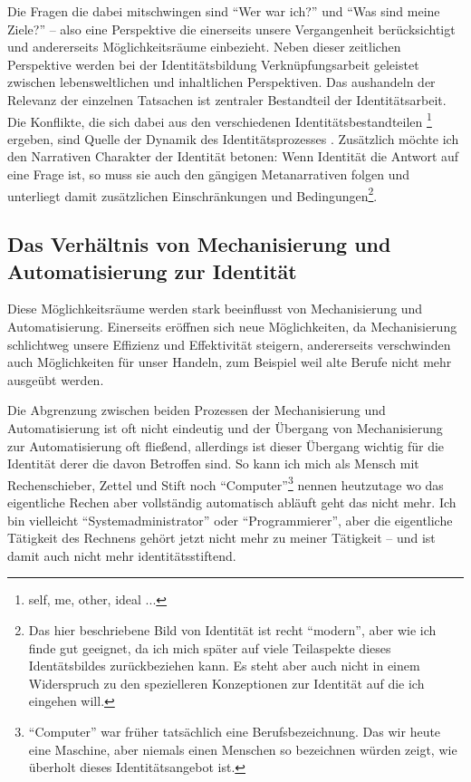Die Fragen die dabei mitschwingen sind \enquote{Wer war ich?} und \enquote{Was sind meine Ziele?} – also eine Perspektive die einerseits unsere Vergangenheit berücksichtigt und andererseits Möglichkeitsräume einbezieht.
Neben dieser zeitlichen Perspektive werden bei der Identitätsbildung Verknüpfungsarbeit geleistet zwischen lebensweltlichen und inhaltlichen Perspektiven.
Das aushandeln der Relevanz der einzelnen Tatsachen ist zentraler Bestandteil der Identitätsarbeit.
Die Konflikte, die sich dabei aus den verschiedenen Identitätsbestandteilen \footnote{self, me, other, ideal ...} ergeben, sind Quelle der Dynamik des Identitätsprozesses \parencite{keupp}.
Zusätzlich möchte ich den Narrativen Charakter der Identität betonen:
Wenn Identität die Antwort auf eine Frage ist, so muss sie auch den gängigen Metanarrativen folgen und unterliegt damit zusätzlichen Einschränkungen und Bedingungen\footnote{Das hier beschriebene Bild von Identität ist recht \enquote{modern}, aber wie ich finde gut geeignet, da ich mich später auf viele Teilaspekte dieses Identätsbildes zurückbeziehen kann. Es steht aber auch nicht in einem Widerspruch zu den spezielleren Konzeptionen zur Identität auf die ich eingehen will.}.

\subsection {Das Verhältnis von Mechanisierung und Automatisierung zur Identität}

Diese Möglichkeitsräume werden stark beeinflusst von Mechanisierung und Automatisierung.
Einerseits eröffnen sich neue Möglichkeiten, da Mechanisierung schlichtweg unsere Effizienz und Effektivität steigern, andererseits verschwinden auch Möglichkeiten für unser Handeln, zum Beispiel weil alte Berufe nicht mehr ausgeübt werden.

Die Abgrenzung zwischen beiden Prozessen der Mechanisierung und Automatisierung ist oft nicht eindeutig und der Übergang von Mechanisierung zur Automatisierung oft fließend, allerdings ist dieser Übergang wichtig für die Identität derer die davon Betroffen sind.
So kann ich mich als Mensch mit Rechenschieber, Zettel und Stift noch \enquote{Computer}\footnote{\enquote{Computer} war früher tatsächlich eine Berufsbezeichnung. Das wir heute  eine Maschine, aber niemals einen Menschen so bezeichnen würden zeigt, wie überholt dieses Identitätsangebot ist.} nennen heutzutage wo das eigentliche Rechen aber vollständig automatisch abläuft geht das nicht mehr.
Ich bin vielleicht \enquote{Systemadministrator} oder \enquote{Programmierer}, aber die eigentliche Tätigkeit des Rechnens gehört jetzt nicht mehr zu meiner Tätigkeit – und ist damit auch nicht mehr identitätsstiftend.

